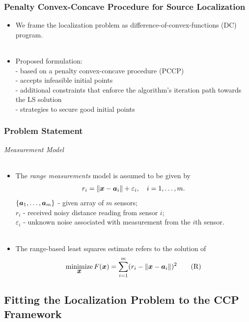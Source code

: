 \documentclass [t] {beamer} %
\begin{document}
\begin{frame} %
\frametitle{Penalty Convex-Concave  Procedure for Source Localization}
\phantom{m}
\begin{itemize}
\item
We frame the localization problem as difference-of-convex-functions
(DC) program.
\\~\\
\item
Proposed formulation:\\
- based on a penalty convex-concave procedure (PCCP)\\
- accepts infeasible initial points\\
- additional constraints that enforce the algorithm's iteration path towards the LS solution\\
- strategies to secure good initial points
\end{itemize}
\end{frame}

\begin{frame} %
\frametitle{Problem Statement }
{\large \textit{Measurement Model}} \\~\\
\normalsize
\begin{itemize}
\item
The \textit{range measurements} model is assumed to be given by
\begin{equation} 
\nonumber
r_i = \|{\mbox{\boldmath$x$}} - {\mbox{\boldmath$a$}}_i\| + \varepsilon_i, \quad i = 1, \ldots , m.
\end{equation}  
$\{\mbox{\boldmath$a$}_1,\ldots, \mbox{\boldmath$a$}_m\}$ - given array of $m$ sensors;\\
$r_i$ - received noisy distance reading from sensor $i$; \\
$\varepsilon_i$ - unknown noise associated with measurement from the $i$th sensor. \\ ~\\

\item
The range-based least squares  estimate refers to the solution of%
\begin{equation} \label{R-LS} 
\mathop{\mbox{minimize}}_{\mbox{\boldmath$x$}} F(\mbox{\boldmath$x$})=\sum_{i=1}^{m} (r_i - \|{\mbox{\boldmath$x$}} - {\mbox{\boldmath$a$}}_i\|)^2	\tag{R}
\end{equation}
\end{itemize}
\end{frame}



\subsection{Fitting the Localization Problem to the CCP Framework}
\end{document}
